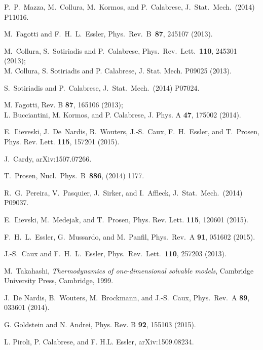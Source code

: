 \documentclass[11pt]{iopart}
\begin{document}
\begin{thebibliography}{99}
P.~P.~Mazza, M.\ Collura, M.\ Kormos, and P.\ Calabrese, J.\ Stat.\ Mech.\   (2014) P11016.

M.~Fagotti and F.~H.~L.~Essler, Phys.\ Rev.\ B\ {\bf87}, 245107 (2013).

M.~Collura, S.~Sotiriadis and P.~Calabrese, Phys.\ Rev.\ Lett.\ {\bf 110}, 245301 (2013);\\
M. Collura, S. Sotiriadis and P. Calabrese, J. Stat. Mech. P09025 (2013).

S.~Sotiriadis and P.~Calabrese, J.\ Stat.\ Mech.\ (2014) P07024. 

M. Fagotti,  Rev. B {\bf 87}, 165106 (2013);\\
L. Bucciantini, M. Kormos, and P. Calabrese, J. Phys. A {\bf 47}, 175002 (2014).



E.~Ilieveski, J.~De~Nardis, B.~Wouters, J.-S.~Caux, F.~H.~Essler, and T.~Prosen, 
Phys. Rev. Lett. {\bf 115}, 157201 (2015). 

J.~Cardy,  arXiv:1507.07266.

T.~Prosen, Nucl.\ Phys.\ B\ {\bf 886}, (2014) 1177.

R.~G.~Pereira, V.~Pasquier, J.~Sirker, and I.~Affleck, J.\ Stat.\ Mech.\ 
(2014) P09037. 

E.~Ilievski, M.~Medejak, and T.~Prosen, Phys. Rev. Lett. {\bf 115}, 120601 (2015).

F.~H.~L.~Essler, G.~Mussardo, and M.~Panfil, Phys.\ Rev.\ A {\bf 91}, 051602 (2015). 

J.-S.~Caux and F.~H.~L.~Essler, Phys.\ Rev.\ Lett.\ {\bf 110}, 257203 (2013). 

M.~Takahashi, {\it Thermodynamics of one-dimensional solvable models}, 
Cambridge University Press, Cambridge, 1999. 

J.~De Nardis, B.~Wouters, M.~Brockmann, and J.-S.~Caux, Phys.\ Rev.\ A {\bf 89}, 033601 (2014). 

G. Goldstein and N. Andrei, %
Phys. Rev. B \textbf{92}, 155103 (2015).

L. Piroli, P. Calabrese, and F. H.L. Essler,
arXiv:1509.08234.


\end{thebibliography}
\end{document}
